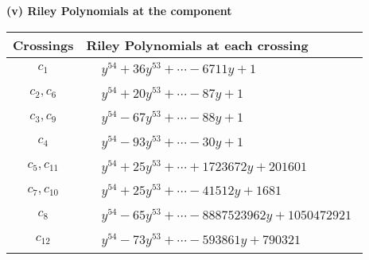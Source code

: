 \documentclass[1p]{elsarticle_modified}
\theoremstyle{definition}
\begin{document}
\newpage\renewcommand{\arraystretch}{1}
\flushleft \textbf{(v) Riley Polynomials at the component}\newline \\
\begin{tabular}{m{50pt}|m{274pt}}
Crossings & \hspace{64pt}Riley Polynomials at each crossing \\
\hline $$\begin{aligned}c_{1}\end{aligned}$$&$\begin{aligned}
&y^{54}+36 y^{53}+\cdots-6711 y+1
\end{aligned}$\\
\hline $$\begin{aligned}c_{2},c_{6}\end{aligned}$$&$\begin{aligned}
&y^{54}+20 y^{53}+\cdots-87 y+1
\end{aligned}$\\
\hline $$\begin{aligned}c_{3},c_{9}\end{aligned}$$&$\begin{aligned}
&y^{54}-67 y^{53}+\cdots-88 y+1
\end{aligned}$\\
\hline $$\begin{aligned}c_{4}\end{aligned}$$&$\begin{aligned}
&y^{54}-93 y^{53}+\cdots-30 y+1
\end{aligned}$\\
\hline $$\begin{aligned}c_{5},c_{11}\end{aligned}$$&$\begin{aligned}
&y^{54}+25 y^{53}+\cdots+1723672 y+201601
\end{aligned}$\\
\hline $$\begin{aligned}c_{7},c_{10}\end{aligned}$$&$\begin{aligned}
&y^{54}+25 y^{53}+\cdots-41512 y+1681
\end{aligned}$\\
\hline $$\begin{aligned}c_{8}\end{aligned}$$&$\begin{aligned}
&y^{54}-65 y^{53}+\cdots-8887523962 y+1050472921
\end{aligned}$\\
\hline $$\begin{aligned}c_{12}\end{aligned}$$&$\begin{aligned}
&y^{54}-73 y^{53}+\cdots-593861 y+790321
\end{aligned}$\\
\hline
\end{tabular}\\~\\
\end{document}
